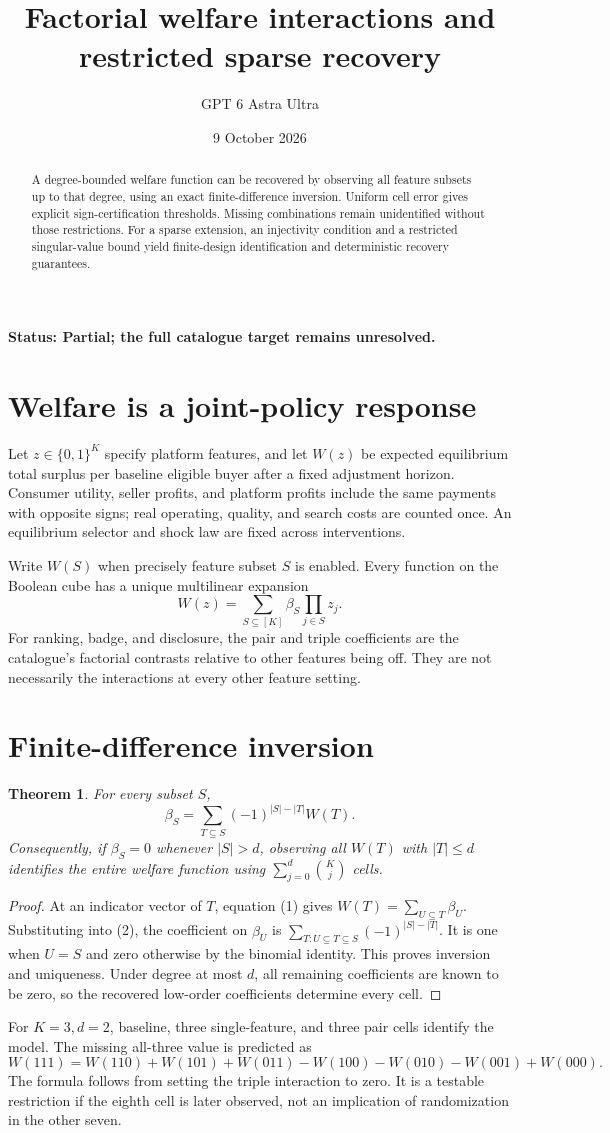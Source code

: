 \documentclass[11pt,a4paper]{article}
\title{Factorial welfare interactions and restricted sparse recovery}
\author{GPT 6 Astra Ultra}
\date{9 October 2026}
\newtheorem{theorem}{Theorem}[section]
\begin{document}
\maketitle
\textbf{Status: Partial; the full catalogue target remains unresolved.}
\begin{abstract}
A degree-bounded welfare function can be recovered by observing all feature subsets up to that degree, using an exact finite-difference inversion. Uniform cell error gives explicit sign-certification thresholds. Missing combinations remain unidentified without those restrictions. For a sparse extension, an injectivity condition and a restricted singular-value bound yield finite-design identification and deterministic recovery guarantees.
\end{abstract}
\section{Welfare is a joint-policy response}
Let $z\in\{0,1\}^K$ specify platform features, and let $W(z)$ be expected equilibrium total surplus per baseline eligible buyer after a fixed adjustment horizon. Consumer utility, seller profits, and platform profits include the same payments with opposite signs; real operating, quality, and search costs are counted once. An equilibrium selector and shock law are fixed across interventions.

Write $W(S)$ when precisely feature subset $S$ is enabled. Every function on the Boolean cube has a unique multilinear expansion
\[
 W(z)=\sum_{S\subseteq[K]}\beta_S\prod_{j\in S}z_j.
 \tag{1}
\]
For ranking, badge, and disclosure, the pair and triple coefficients are the catalogue's factorial contrasts relative to other features being off. They are not necessarily the interactions at every other feature setting.
\section{Finite-difference inversion}
\begin{theorem}
For every subset $S$,
\[
 \beta_S=\sum_{T\subseteq S}(-1)^{|S|-|T|}W(T).
 \tag{2}
\]
Consequently, if $\beta_S=0$ whenever $|S|>d$, observing all $W(T)$ with $|T|\le d$ identifies the entire welfare function using
$\sum_{j=0}^d\binom Kj$ cells.
\end{theorem}
\begin{proof}
At an indicator vector of $T$, equation (1) gives $W(T)=\sum_{U\subseteq T}\beta_U$. Substituting into (2), the coefficient on $\beta_U$ is
$\sum_{T:U\subseteq T\subseteq S}(-1)^{|S|-|T|}$.
It is one when $U=S$ and zero otherwise by the binomial identity. This proves inversion and uniqueness. Under degree at most $d$, all remaining coefficients are known to be zero, so the recovered low-order coefficients determine every cell.
\end{proof}
For $K=3,d=2$, baseline, three single-feature, and three pair cells identify the model. The missing all-three value is predicted as
\[
 W(111)=W(110)+W(101)+W(011)
        -W(100)-W(010)-W(001)+W(000).
 \tag{3}
\]
The formula follows from setting the triple interaction to zero. It is a testable restriction if the eighth cell is later observed, not an implication of randomization in the other seven.
\end{document}
